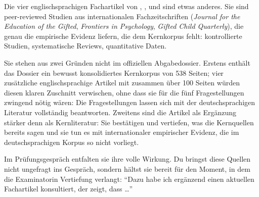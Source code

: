 \documentclass[ngerman, a4paper]{article}
\begin{document}
Die vier englischsprachigen Fachartikel von \textcite{mun2020identifying},
\textcite{gubbins2020promising}, \textcite{alhroub2021utility} und
\textcite{alodat2025equitable} sind etwas anderes. Sie sind peer-reviewed
Studien aus internationalen Fachzeitschriften
(\textit{Journal for the Education of the Gifted}, \textit{Frontiers in Psychology},
\textit{Gifted Child Quarterly}), die genau die empirische Evidenz liefern, die dem
Kernkorpus fehlt: kontrollierte Studien, systematische Reviews, quantitative Daten.

Sie stehen aus zwei Gründen nicht im offiziellen Abgabedossier. Erstens enthält das
Dossier ein bewusst konsolidiertes Kernkorpus von 538 Seiten; vier zusätzliche
englischsprachige Artikel mit zusammen über 100 Seiten würden diesen klaren Zuschnitt
verwischen, ohne dass sie für die fünf Fragestellungen zwingend nötig wären: Die
Fragestellungen lassen sich mit der deutschsprachigen Literatur vollständig beantworten.
Zweitens sind die Artikel als Ergänzung stärker denn als Kernliteratur: Sie bestätigen und
vertiefen, was die Kernquellen bereits sagen und sie tun es mit internationaler empirischer
Evidenz, die im deutschsprachigen Korpus so nicht vorliegt.

Im Prüfungsgespräch entfalten sie ihre volle Wirkung. Du bringst diese Quellen nicht
ungefragt ins Gespräch, sondern hältst sie bereit für den Moment, in dem die Examinatorin
Vertiefung verlangt: \enquote{Dazu habe ich ergänzend einen aktuellen Fachartikel
  konsultiert, der zeigt, dass \ldots}
\end{document}
